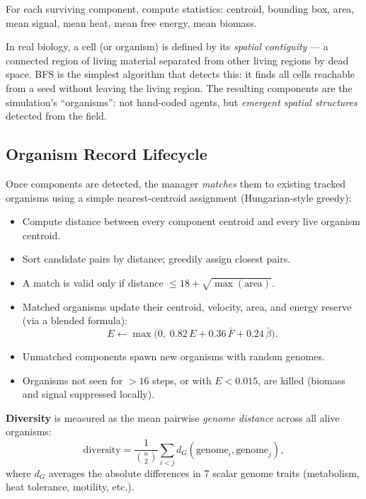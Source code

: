 \documentclass[12pt,a4paper]{article}
\begin{document}
For each surviving component, compute statistics:
centroid, bounding box, area,
mean signal, mean heat, mean free energy, mean biomass.

\begin{tcolorbox}[intubox={Why connected components?}]
In real biology, a cell (or organism) is defined by its
\emph{spatial contiguity} — a connected region of living material
separated from other living regions by dead space.
BFS is the simplest algorithm that detects this:
it finds all cells reachable from a seed without leaving the
living region.
The resulting components are the simulation's ``organisms'':
not hand-coded agents, but \emph{emergent spatial structures}
detected from the field.
\end{tcolorbox}

\subsection{Organism Record Lifecycle}

Once components are detected, the manager
\emph{matches} them to existing tracked organisms
using a simple nearest-centroid assignment (Hungarian-style greedy):

\begin{itemize}[nosep]
  \item Compute distance between every component centroid and
    every live organism centroid.
  \item Sort candidate pairs by distance; greedily assign closest pairs.
  \item A match is valid only if distance $\leq 18 + \sqrt{\max(\text{area})}$.
  \item Matched organisms update their centroid, velocity, area,
    and energy reserve (via a blended formula):
    \[
      E \leftarrow \max\!\bigl(0,\;0.82\,E + 0.36\,\bar{F} + 0.24\,\bar{\beta}\bigr).
    \]
  \item Unmatched components spawn new organisms with random genomes.
  \item Organisms not seen for $>16$ steps, or with $E < 0.015$,
    are killed (biomass and signal suppressed locally).
\end{itemize}

\textbf{Diversity} is measured as the mean pairwise
\emph{genome distance} across all alive organisms:
\[
  \text{diversity} = \frac{1}{\binom{n}{2}}
  \sum_{i < j} d_G(\text{genome}_i, \text{genome}_j),
\]
where $d_G$ averages the absolute differences in
7 scalar genome traits (metabolism, heat tolerance, motility, etc.).
\end{document}
